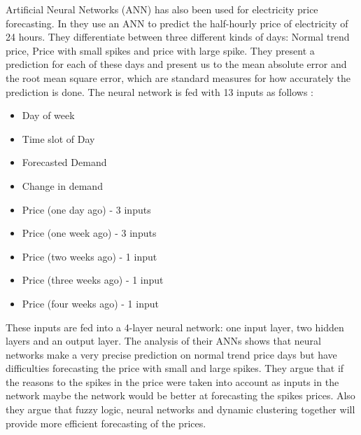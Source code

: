 Artificial Neural Networks (ANN) has also been used for electricity price forecasting. In \cite{singhal2011electricity} they use an ANN to predict the half-hourly price of electricity of 24 hours. They differentiate between three different kinds of days: Normal trend price, Price with small spikes and price with large spike. They present a prediction for each of these days and present us to the mean absolute error and the root mean square error, which are standard measures for how accurately the prediction is done. The neural network is fed with 13 inputs as follows \cite{singhal2011electricity}:
\begin{itemize}[noitemsep,topsep=3pt,parsep=2pt,partopsep=3pt]
\item Day of week
\item Time slot of Day
\item Forecasted Demand
\item Change in demand
\item Price (one day ago) - 3 inputs 
\item Price (one week ago) - 3 inputs
\item Price (two weeks ago) - 1 input 
\item Price (three weeks ago) - 1 input 
\item Price (four weeks ago) - 1 input
\end{itemize}
These inputs are fed into a 4-layer neural network: one input layer, two hidden layers and an output layer. The analysis of their ANNs shows that neural networks make a very precise prediction on normal trend price days but have difficulties forecasting the price with small and large spikes. They argue that if the reasons to the spikes in the price were taken into account as inputs in the network maybe the network would be better at forecasting the spikes prices. Also they argue that fuzzy logic, neural networks and dynamic clustering together will provide more efficient forecasting of the prices.